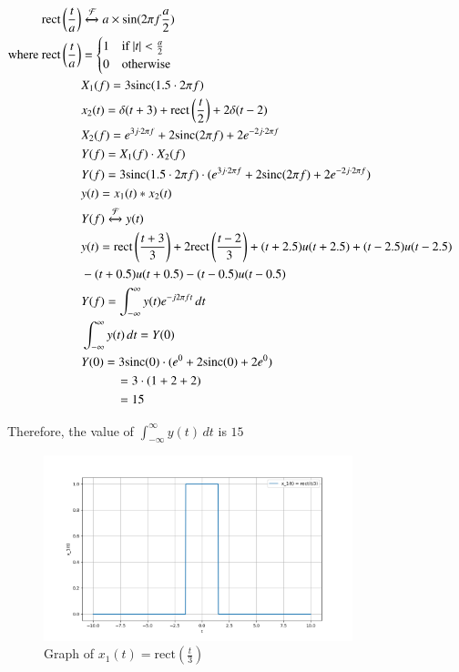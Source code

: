\documentclass[journal,12pt,onecolumn]{IEEEtran}
\theoremstyle{remark}
\begin{document}
\begin{align}
\text{rect}\left(\frac{t}{a}\right) &\xleftrightarrow{\mathcal{F}} a \times \sin(2\pi f \frac{a}{2}) \\
\text{where } \text{rect}\left(\frac{t}{a}\right) &= \begin{cases}
1 & \text{if } |t| < \frac{a}{2} \\
0 & \text{otherwise}
\end{cases}\\
& X_1(f)=3\text{sinc}(1.5\cdot 2\pi f) & \\
& x_2(t) = \delta(t+3) + \text{rect}\left(\frac{t}{2}\right) + 2\delta(t-2) & \\
& X_2(f) = e^{3j\cdot 2\pi f} + 2\text{sinc}(2\pi f) + 2e^{-2j \cdot 2\pi f} & \\
& Y(f) = X_1(f) \cdot X_2(f) \\
& Y(f)= 3\text{sinc}(1.5 \cdot 2\pi f) \cdot (e^{3j \cdot 2\pi f} + 2\text{sinc}(2\pi f) + 2e^{-2j \cdot 2\pi f})\\
& y(t) = x_1(t) * x_2(t) \\
& Y(f) \xleftrightarrow{\mathcal{F}} y(t)\\
& y(t) = \text{rect}\left(\frac{t+3}{3}\right) + 2\text{rect}\left(\frac{t-2}{3}\right) + (t+2.5)u(t+2.5) + (t-2.5)u(t-2.5) \\
& - (t+0.5)u(t+0.5) - (t-0.5)u(t-0.5)\\
& Y(f) = \int_{-\infty}^{\infty} y(t) e^{-j2\pi ft} \, dt\\
& \int_{-\infty}^{\infty} y(t) \, dt = Y(0)\\
& Y(0)= 3\text{sinc}(0) \cdot (e^{0} + 2\text{sinc}(0) + 2e^{0}) \\
&\hspace{1cm}= 3\cdot (1 + 2 + 2) \\
&\hspace{1cm}= 15
\end{align}



Therefore, the value of $\int_{-\infty}^{\infty} y(t) \, dt$ is $15$


\begin{figure}[htbp]
    \centering
    \includegraphics[width=0.8\textwidth]{2023/EC/58/figs/gate_x1.png}
    \caption{Graph of \(x_1(t) = \text{rect}\left(\frac{t}{3}\right)\)}
    \label{fig:x_1_graph}
\end{figure}
\end{document}
